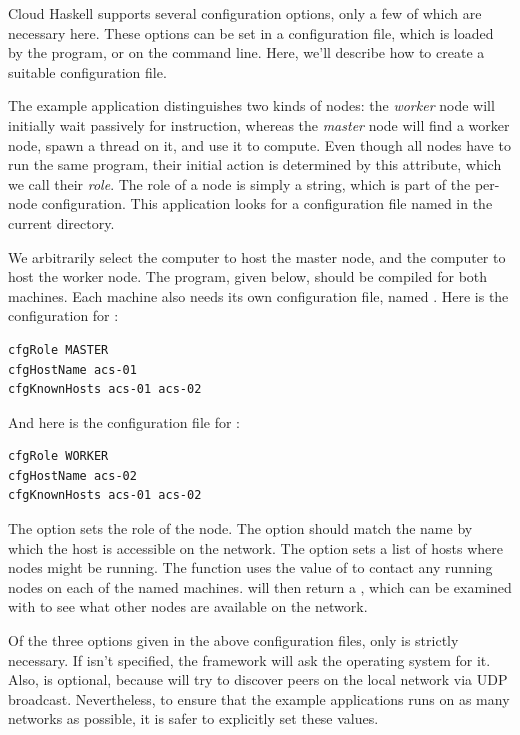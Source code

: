 \documentclass[preprint]{sigplanconf}
\begin{document}
Cloud Haskell supports several configuration options, only a few of which are necessary here. These options can be set in a configuration file, which is loaded by the program, or on the command line. Here, we'll describe how to create a suitable configuration file.

The example application distinguishes two kinds of nodes: the {\em worker} node will initially wait passively for instruction, whereas the {\em master} node will find a worker node, spawn a thread on it, and use it to compute. Even though all nodes have to run the same program, their initial action is determined by this attribute, which we call their {\em role}. The role of a node is simply a string, which is part of the per-node configuration. This application looks for a configuration file named  in the current directory.

We arbitrarily select the computer  to host the master node, and the computer  to host the worker node. The program, given below, should be compiled for both machines. Each machine also needs its own configuration file, named . Here is the configuration for :

\begin{lstlisting}
cfgRole MASTER
cfgHostName acs-01
cfgKnownHosts acs-01 acs-02
\end{lstlisting}

\noindent
And here is the configuration file for :

\begin{lstlisting}
cfgRole WORKER
cfgHostName acs-02
cfgKnownHosts acs-01 acs-02
\end{lstlisting}

The  option sets the role of the node. The  option should match the name by which the host is accessible on the network. The  option sets a list of hosts where nodes might be running. The  function uses the value of  to contact any running nodes on each of the named machines.  will then return a , which can be examined with  to see what other nodes are available on the network.

Of the three options given in the above configuration files, only  is strictly necessary. If  isn't specified, the framework will ask the operating system for it. Also,  is optional, because  will try to discover peers on the local network via UDP broadcast. Nevertheless, to ensure that the example applications runs on as many networks as possible, it is safer to explicitly set these values.
\end{document}
